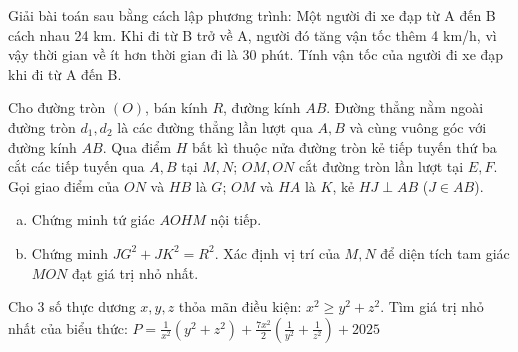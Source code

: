 \begin{ex}
	Giải bài toán sau bằng cách lập phương trình:
	Một người đi xe đạp từ A đến B cách nhau 24 km. Khi đi từ B trở về A, người đó tăng vận tốc thêm 4 km/h, vì vậy thời gian về ít hơn thời gian đi là 30 phút. Tính vận tốc của người đi xe đạp khi đi từ A đến B.
\end{ex}
\begin{ex} %
	Cho đường tròn $(O)$, bán kính $R$, đường kính $AB$. Đường thẳng nằm ngoài đường tròn $d_1, d_2$ là các đường thẳng lần lượt qua $A, B$ và cùng vuông góc với đường kính $AB$. Qua điểm $H$ bất kì thuộc nửa đường tròn kẻ tiếp tuyến thứ ba cắt các tiếp tuyến qua $A, B$ tại $M, N$; $OM, ON$ cắt đường tròn lần lượt tại $E, F$. Gọi giao điểm của $ON$ và $HB$ là $G$; $OM$ và $HA$ là $K$, kẻ $HJ \perp AB$ ($J \in AB$).
	\begin{enumerate}[a)]
		\item Chứng minh tứ giác $AOHM$ nội tiếp.
		\item Chứng minh $JG^2 + JK^2 = R^2$. Xác định vị trí của $M, N$ để diện tích tam giác $MON$ đạt giá trị nhỏ nhất.
	\end{enumerate}
	\loigiai{}
\end{ex}

\begin{ex} %
	Cho 3 số thực dương $x, y, z$ thỏa mãn điều kiện: $x^2 \ge y^2 + z^2$.
	Tìm giá trị nhỏ nhất của biểu thức: $P = \frac{1}{x^2}(y^2+z^2) + \frac{7x^2}{2}\left(\frac{1}{y^2}+\frac{1}{z^2}\right) + 2025$
	\loigiai{}
\end{ex}

